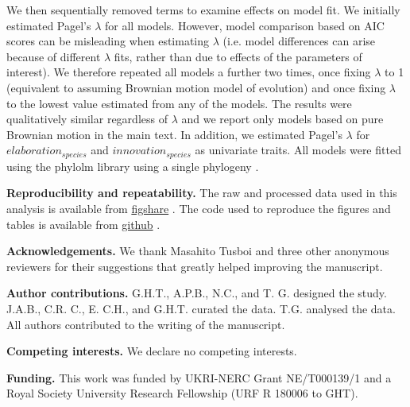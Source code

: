 \documentclass[12pt,letterpaper]{article}
\begin{document}
We then sequentially removed terms to examine effects on model fit.
We initially estimated Pagel's $\lambda$ \cite{pagel1997inferring} for all models.
However, model comparison based on AIC scores can be misleading when estimating $\lambda$ (i.e. model differences can arise because of different $\lambda$ fits, rather than due to effects of the parameters of interest).
We therefore repeated all models a further two times, once fixing $\lambda$ to 1 (equivalent to assuming Brownian motion model of evolution) and once fixing $\lambda$ to the lowest value estimated from any of the models.
The results were qualitatively similar regardless of $\lambda$ and we report only models based on pure Brownian motion in the main text.
In addition, we estimated Pagel’s $\lambda$ for $elaboration_{species}$ and $innovation_{species}$ as univariate traits.
All models were fitted using the phylolm library using a single phylogeny \cite{phylom}.

\textbf{Reproducibility and repeatability.}
The raw and processed data used in this analysis is available from \href{https://figshare.com/articles/dataset/Innovation_and_elaboration_on_the_avian_tree_of_life/20480355}{figshare} \cite{fighsaredata}.
The code used to reproduce the figures and tables is available from \href{https://github.com/TGuillerme/elaboration_exploration_bird_beaks}{github} \cite{githubrepo}.

\textbf{Acknowledgements.}
We thank Masahito Tusboi and three other anonymous reviewers for their suggestions that greatly helped improving the manuscript.

\textbf{Author contributions.} G.H.T., A.P.B., N.C., and T. G. designed the study. J.A.B., C.R. C., E. C.H.,  and G.H.T. curated the data. T.G. analysed the data. All authors contributed to the writing of the manuscript.

\textbf{Competing interests.} We declare no competing interests.

\textbf{Funding.}
This work was funded by UKRI-NERC Grant NE/T000139/1 and a Royal Society University Research Fellowship (URF R 180006 to GHT).




\end{document}
